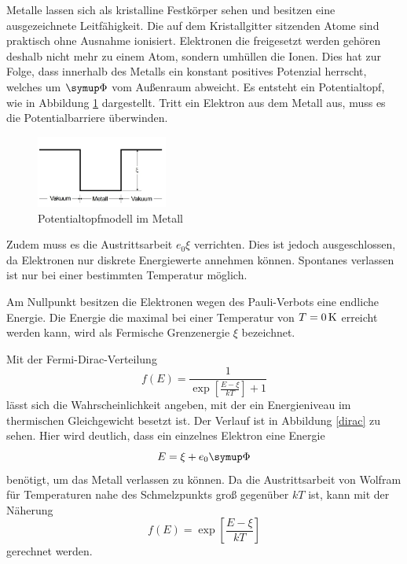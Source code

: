 Metalle lassen sich als kristalline Festkörper sehen und besitzen eine ausgezeichnete
Leitfähigkeit. Die auf dem Kristallgitter sitzenden Atome sind praktisch
ohne Ausnahme ionisiert. Elektronen die freigesetzt werden gehören deshalb nicht
mehr zu einem Atom, sondern umhüllen die Ionen. Dies hat zur Folge, dass innerhalb
des Metalls ein konstant positives Potenzial herrscht, welches um $\su{\Phi}$
vom Außenraum abweicht. Es entsteht ein Potentialtopf, wie in Abbildung \ref{topf}
dargestellt.
Tritt ein Elektron aus dem Metall aus, muss es die Potentialbarriere überwinden.

\begin{figure}
  \includegraphics[width=4.3cm]{bilder/topf.jpg}
  \caption{Potentialtopfmodell im Metall \cite{504}}
  \label{topf}
\end{figure}
Zudem muss es die Austrittsarbeit $e_0\xi$ verrichten. Dies ist jedoch ausgeschlossen,
da Elektronen nur diskrete Energiewerte annehmen können. Spontanes verlassen ist
nur bei einer bestimmten Temperatur möglich.

Am Nullpunkt besitzen die Elektronen wegen des Pauli-Verbots eine endliche
Energie. Die Energie die maximal bei einer Temperatur von $T=0\,\si{\kelvin}$ erreicht
werden kann, wird als Fermische Grenzenergie $\xi$ bezeichnet.

Mit der Fermi-Dirac-Verteilung
\begin{equation}
  f(E) = \frac{1}{\exp\left[\frac{E-\xi}{kT}\right]+1}
  \label{eqn:fermi}
\end{equation}
lässt sich die Wahrscheinlichkeit angeben, mit der ein Energieniveau im thermischen
Gleichgewicht besetzt ist. Der Verlauf ist in Abbildung \ref{dirac} zu sehen.
Hier wird deutlich, dass ein einzelnes Elektron eine Energie
\begin{equation*}
  E = \xi + e_0\su{\Phi}
\end{equation*}
benötigt, um das Metall verlassen zu können. Da die Austrittsarbeit von Wolfram
für Temperaturen nahe des Schmelzpunkts groß gegenüber $kT$ ist, kann mit
der Näherung
\begin{equation}
  f(E) = \exp\left[\frac{E-\xi}{kT}\right]
  \label{eqn:fermi2}
\end{equation}
gerechnet werden.

